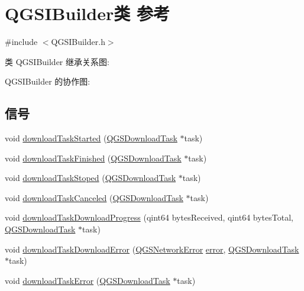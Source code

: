 \hypertarget{class_q_g_s_i_builder}{}\section{Q\+G\+S\+I\+Builder类 参考}
\label{class_q_g_s_i_builder}


{\ttfamily \#include $<$Q\+G\+S\+I\+Builder.\+h$>$}



类 Q\+G\+S\+I\+Builder 继承关系图\+:


Q\+G\+S\+I\+Builder 的协作图\+:
\subsection*{信号}
\begin{DoxyCompactItemize}
\item 
void \mbox{\hyperlink{class_q_g_s_i_builder_a95244ad7dbf6d0234ea1cf49c58785e3}{download\+Task\+Started}} (\mbox{\hyperlink{class_q_g_s_download_task}{Q\+G\+S\+Download\+Task}} $\ast$task)
\item 
void \mbox{\hyperlink{class_q_g_s_i_builder_acb9d50b1936cf4d2217229f0aecc2283}{download\+Task\+Finished}} (\mbox{\hyperlink{class_q_g_s_download_task}{Q\+G\+S\+Download\+Task}} $\ast$task)
\item 
void \mbox{\hyperlink{class_q_g_s_i_builder_a9fabcd4fbd11dc08891c0b100495869c}{download\+Task\+Stoped}} (\mbox{\hyperlink{class_q_g_s_download_task}{Q\+G\+S\+Download\+Task}} $\ast$task)
\item 
void \mbox{\hyperlink{class_q_g_s_i_builder_a5db21e1acb0ab56bcd72bc1a31311f02}{download\+Task\+Canceled}} (\mbox{\hyperlink{class_q_g_s_download_task}{Q\+G\+S\+Download\+Task}} $\ast$task)
\item 
void \mbox{\hyperlink{class_q_g_s_i_builder_a8df86a040c261191047f9ee5b2266323}{download\+Task\+Download\+Progress}} (qint64 bytes\+Received, qint64 bytes\+Total, \mbox{\hyperlink{class_q_g_s_download_task}{Q\+G\+S\+Download\+Task}} $\ast$task)
\item 
void \mbox{\hyperlink{class_q_g_s_i_builder_a9f8aa4e00ba1d459c5698579b8292b29}{download\+Task\+Download\+Error}} (\mbox{\hyperlink{class_q_g_s_network_error}{Q\+G\+S\+Network\+Error}} \mbox{\hyperlink{class_q_g_s_task_a0ac4592b48e8de87af4f92c4a98a1763}{error}}, \mbox{\hyperlink{class_q_g_s_download_task}{Q\+G\+S\+Download\+Task}} $\ast$task)
\item 
void \mbox{\hyperlink{class_q_g_s_i_builder_ac1d135bb45a9ecf1dc7a1cd16074415c}{download\+Task\+Error}} (\mbox{\hyperlink{class_q_g_s_download_task}{Q\+G\+S\+Download\+Task}} $\ast$task)
\end{DoxyCompactItemize}
